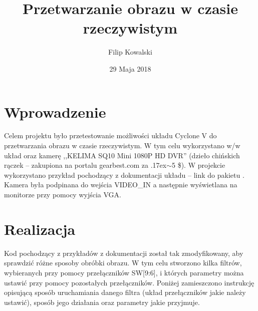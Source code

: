 \documentclass{article}
\title{Przetwarzanie obrazu w czasie rzeczywistym}
\author{Filip Kowalski}
\date{29 Maja 2018}
\newcommand{\tylda }{{\raise.17ex\hbox{$\scriptstyle\sim$}}}
\begin{document}
\maketitle

\section*{Wprowadzenie}
Celem projektu było przetestowanie możliwości układu Cyclone V do przetwarzania obrazu w czasie rzeczywistym. W tym celu wykorzystano w/w układ oraz kamerę ,,KELIMA SQ10 Mini 1080P HD DVR'' (dzieło chińskich rączek -- zakupiona na portalu gearbest.com za \tylda 5 \$). W projekcie wykorzystano przykład pochodzący z dokumentacji układu -- link do pakietu \cite{przyklad}. Kamera była podpinana do wejścia VIDEO\_IN a następnie wyświetlana na monitorze przy pomocy wyjścia VGA. 

\section*{Realizacja}
Kod pochodzący z przykładów z dokumentacji został tak zmodyfikowany, aby sprawdzić różne sposoby obróbki obrazu. W tym celu stworzono kilka filtrów, wybieranych  przy pomocy przełączników SW[9:6], i których parametry można ustawić przy pomocy pozostałych przełączników. Poniżej zamieszczono instrukcję opisującą sposób uruchamiania danego filtra (układ przełączników jakie należy ustawić), sposób jego działania oraz parametry jakie przyjmuje.
\end{document}
